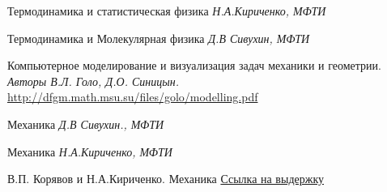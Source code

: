 \documentclass[twoside,twocolumn, 11pt]{article}
\theoremstyle{plain}
\theoremstyle{definition}
\begin{document}
\begin{thebibliography}{99} %

Термодинамика и статистическая физика {\em
Н.А.Кириченко, МФТИ}

Термодинамика и Молекулярная физика {\em
Д.В Сивухин, МФТИ}

Компьютерное моделирование и визуализация задач механики и
геометрии. {\em Авторы В.Л. Голо, Д.О. Синицын.}
\href{http://dfgm.math.msu.su/files/golo/modelling.pdf}{http://dfgm.math.msu.su/files/golo/modelling.pdf}

Механика {\em Д.В Сивухин., МФТИ}

Механика {\em Н.А.Кириченко, МФТИ}

В.П. Корявов и Н.А.Кириченко. Механика
\href{https://vk.com/doc85020018_467835549?hash=d80f20a3d0b8f6643c&dl=bc29371e14b5f0ebd0}{Ссылка на выдержку}

\end{thebibliography}

\end{document}
